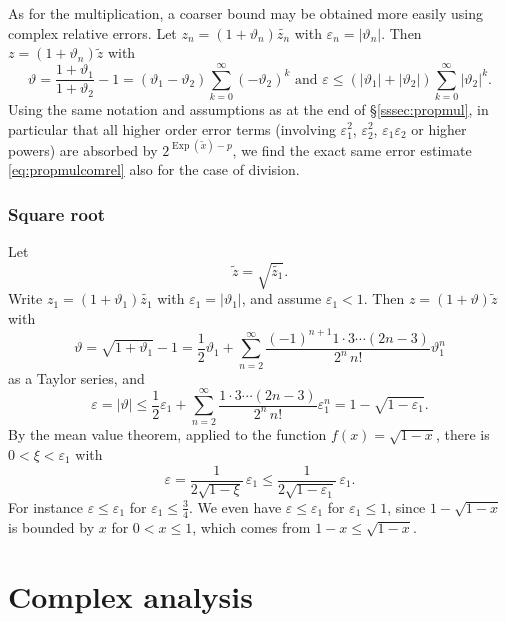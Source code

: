 \documentclass [11pt]{article}
\newcommand {\corr}[1]{{#1}}
\newcommand {\appro}[1]{\widetilde {#1}}
\DeclareMathOperator{\Exp}{\operatorname {Exp}}
\renewcommand {\epsilon}{\varepsilon}
\renewcommand {\theta}{\vartheta}
\renewcommand {\leq}{\leqslant}
\begin{document}
As for the multiplication, a coarser
bound may be obtained more easily using complex relative errors.
Let $\corr {z_n} = (1 + \theta_n) \appro {z_n}$ with
$\epsilon_n = | \theta_n |$. Then $\corr z = (1 + \theta_n) \appro z$
with
\[
\theta = \frac {1 + \theta_1}{1 + \theta_2} - 1
= (\theta_1 - \theta_2) \sum_{k = 0}^\infty (- \theta_2)^k
\text { and }
\epsilon \leq (|\theta_1| + |\theta_2|) \sum_{k = 0}^\infty |\theta_2|^k.
\]
Using the same notation and assumptions as at the end of
\S\ref {sssec:propmul}, in particular that all higher order error terms
(involving $\epsilon_1^2$, $\epsilon_2^2$, $\epsilon_1 \epsilon_2$
or higher powers) are absorbed by $2^{\Exp (\appro x) - p}$,
we find the exact same error estimate \eqref {eq:propmulcomrel}
also for the case of division.


\subsubsection {Square root}
Let
\[
\appro z = \sqrt {\appro {z_1}}.
\]
Write $\corr {z_1} = (1 + \theta_1) \appro {z_1}$ with
$\epsilon_1 = |\theta_1|$, and assume $\epsilon_1 < 1$.
Then $\corr z = (1 + \theta) \appro z$ with
\[
\theta = \sqrt {1 + \theta_1} - 1
= \frac {1}{2} \theta_1
+ \sum_{n=2}^\infty \frac {(-1)^{n+1} 1 \cdot 3 \cdots (2 n - 3)}{2^n \, n!}
   \theta_1^n
\]
as a Taylor series, and
\[
\epsilon = |\theta|
\leq
\frac {1}{2}  \epsilon_1
+ \sum_{n=2}^\infty \frac {1 \cdot 3 \cdots (2 n - 3)}{2^n \, n!}
\epsilon_1^n
= 1 - \sqrt {1 - \epsilon_1}.
\]
By the mean value theorem, applied to the function $f (x) = \sqrt {1 - x}$,
there is $0 < \xi < \epsilon_1$ with
\begin {equation}
\label {eq:propsqrt}
\epsilon = \frac {1}{2 \sqrt {1 - \xi}} \, \epsilon_1
\leq \frac {1}{2 \sqrt {1 - \epsilon_1}} \, \epsilon_1.
\end {equation}
For instance $\epsilon \leq \epsilon_1$ for $\epsilon_1 \leq \frac {3}{4}$.
We even have $\epsilon \leq \epsilon_1$ for $\epsilon_1 \leq 1$,
since $1 - \sqrt{1-x}$ is bounded by $x$
for $0 < x \leq 1$, which comes from $1 - x \leq \sqrt{1-x}$.



\section {Complex analysis}
\end{document}
